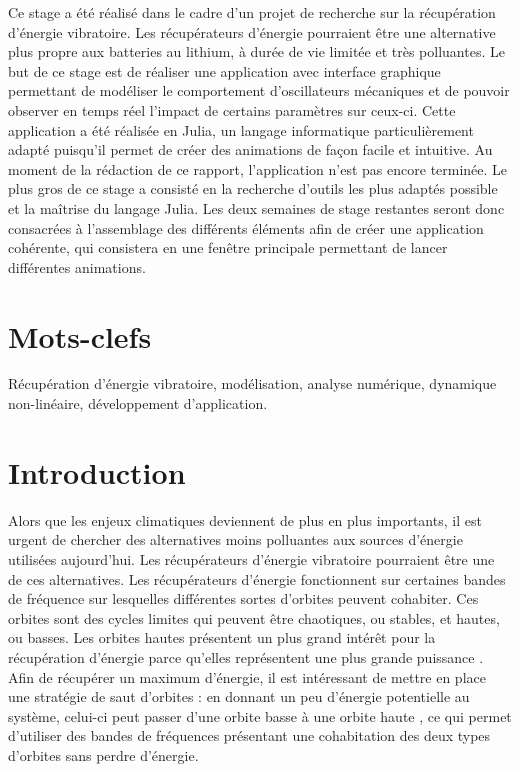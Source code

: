 \documentclass[a4paper, french, 12pt, titlepage]{article}
\begin{document}
Ce stage a été réalisé dans le cadre d'un projet de recherche sur la récupération d'énergie vibratoire.
Les récupérateurs d'énergie pourraient être une alternative plus propre aux batteries au lithium, à durée de vie limitée et très polluantes. Le but de ce stage est de réaliser une application avec interface graphique permettant de modéliser le comportement d'oscillateurs mécaniques et de pouvoir observer en temps réel l'impact de certains paramètres sur ceux-ci.
Cette application a été réalisée en Julia, un langage informatique particulièrement adapté puisqu'il permet de créer des animations de façon facile et intuitive. Au moment de la rédaction de ce rapport, l'application n'est pas encore terminée.
Le plus gros de ce stage a consisté en la recherche d'outils les plus adaptés possible et la maîtrise du langage Julia. Les deux semaines de stage restantes seront donc consacrées à l'assemblage des différents éléments afin de créer une application cohérente, qui consistera en une fenêtre principale permettant de lancer différentes animations.



\section*{Mots-clefs}

Récupération d'énergie vibratoire, modélisation, analyse numérique, dynamique non-linéaire, développement d'application.

\newpage

\tableofcontents

\newpage



\section{Introduction}



Alors que les enjeux climatiques deviennent de plus en plus importants, il est urgent de chercher des alternatives moins polluantes aux sources d'énergie utilisées aujourd'hui.
Les récupérateurs d'énergie vibratoire pourraient être une de ces alternatives.
Les récupérateurs d'énergie fonctionnent sur certaines bandes de fréquence sur lesquelles différentes sortes d'orbites peuvent cohabiter.
Ces orbites sont des cycles limites qui peuvent être chaotiques, ou stables, et hautes, ou basses.
Les orbites hautes présentent un plus grand intérêt pour la récupération d'énergie parce qu'elles représentent une plus grande puissance \cite{saint2022power}.
Afin de récupérer un maximum d'énergie, il est intéressant de mettre en place une stratégie de saut d'orbites : en donnant un peu d'énergie potentielle au système, celui-ci peut passer d'une orbite basse à une orbite haute \cite{huguet2018phd}, ce qui permet d'utiliser des bandes de fréquences présentant une cohabitation des deux types d'orbites sans perdre d'énergie.
\end{document}

